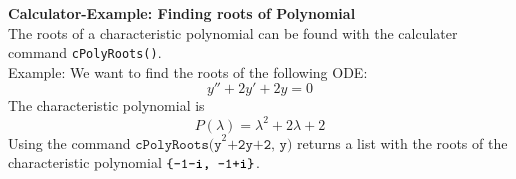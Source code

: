 \textbf{Calculator-Example: Finding roots of Polynomial}\\
The roots of a characteristic polynomial can be found with the calculater command \texttt{cPolyRoots()}.\\
Example: We want to find the roots of the following ODE:
\begin{equation}
  y''+2y'+2y = 0
\end{equation}
The characteristic polynomial is
\begin{equation}
  P(\lambda) = \lambda^2 + 2\lambda + 2
\end{equation}
Using the command $\texttt{cPolyRoots(y}^2 \texttt{+2y+2, y)}$ returns a list with the roots of the characteristic polynomial
$\texttt{\{-1-\textbf{i}, -1+\textbf{i}\}} $.
